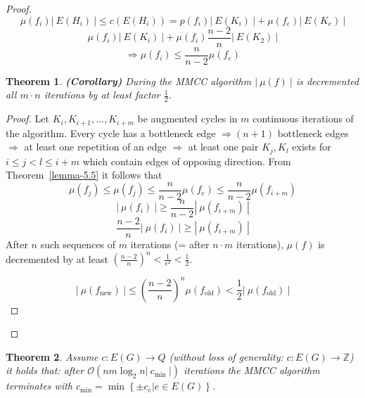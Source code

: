 \documentclass{article}
\newtheorem{theorem}{Theorem}
\newcommand{\card}[1]{\left|\:\!#1\:\!\right|}
\newcommand{\set}[1]{\left\{#1\right\}}
\begin{document}
\begin{proof}
  \[ \mu(f_i) \card{E(H_i)} \leq c(E(H_i)) = p(f_i) \card{E(K_i)} + \mu(f_e)\card{E(K_e)} \]
  \[ \mu(f_i) \card{E(K_i)} + \mu(f_i) \frac{n-2}{n} \card{E(K_2)} \]
  \[ \Rightarrow \mu(f_i) \leq \frac{n}{n-2} \mu(f_e) \]

  \begin{theorem}
    \textbf{(Corollary)}
    During the MMCC algorithm $\card{\mu(f)}$ is decremented all $m\cdot n$ iterations by at least factor $\frac12$.
  \end{theorem}
  \begin{proof}
    Let $K_i, K_{i+1}, \ldots, K_{i+m}$ be augmented cycles in $m$ continuous iterations of the algorithm.
    Every cycle has a bottleneck edge $\Rightarrow (n+1)$ bottleneck edges $\Rightarrow$ at least one repetition of an edge $\Rightarrow$ at least one pair $K_j, K_l$ exists for $i \leq j < l \leq i + m$ which contain edges of opposing direction. From Theorem~\ref{lemma-5.5} it follows that
    \[
      \mu(f_j) \leq \mu(f_j) \leq \frac{n}{n-2} \mu(f_e) \leq \frac{n}{n-2} \mu(f_{i+m})
    \] \[
      \card{\mu(f_i)} \geq \frac{n}{n-2} \card{\mu(f_{i+m})}
    \] \[
      \frac{n-2}{n} \card{\mu(f_i)} \geq \card{\mu(f_{i+m})}
    \]
    After $n$ such sequences of $m$ iterations (= after $n\cdot m$ iterations), $\mu(f)$ is decremented by at least $\left(\frac{n-2}{n}\right)^n < \frac{1}{e^2} < \frac12$.

    \[
      \card{\mu(f_{\text{new}})} \leq \left(\frac{n-2}{n}\right)^n \mu(f_{\text{old}}) < \frac12 \card{\mu(f_{\text{old}})}
    \]
  \end{proof}
\end{proof}

\begin{theorem}\label{proposition-5.6}
  Assume $c: E(G) \rightarrow Q$ (without loss of generality: $c: E(G) \rightarrow \mathbb{Z}$) it holds that:
  after $\mathcal{O}(nm \log_2{n} \card{c_{\text{min}}})$ iterations the MMCC algorithm terminates with
  $c_{\text{min}} = \min\set{\pm c_e | e \in E(G)}$.
\end{theorem}
\end{document}
